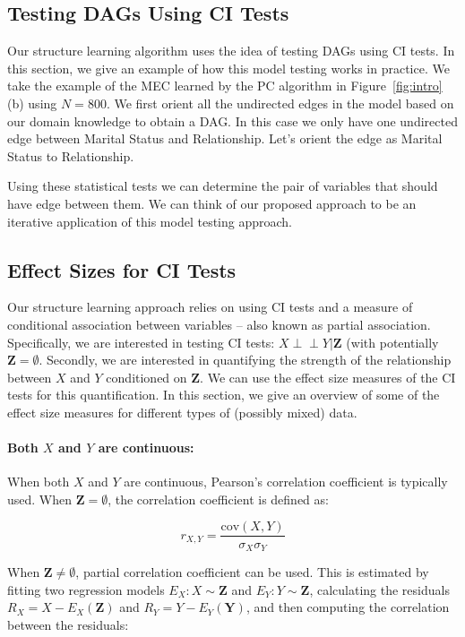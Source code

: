 \documentclass{uai2025} %
\def\ci{\perp\!\!\!\!\!\perp}
\begin{document}
\subsection{Testing DAGs Using CI Tests}
Our structure learning algorithm uses the idea of testing DAGs using CI tests.
In this section, we give an example of how this model testing works in
practice. We take the example of the MEC learned by the PC algorithm in
Figure~\ref{fig:intro}(b) using $ N=800 $. We first orient all the undirected
edges in the model based on our domain knowledge to obtain a DAG. In this case
we only have one undirected edge between Marital Status and Relationship. Let's
orient the edge as Marital Status to Relationship. 

Using these statistical tests we can determine the pair of variables that
should have edge between them. We can think of our proposed approach to be an
iterative application of this model testing approach.

\subsection{Effect Sizes for CI Tests}

Our structure learning approach relies on using CI tests and a measure of
conditional association between variables -- also known as partial association.
Specifically, we are interested in testing CI tests: $ X \ci Y \rvert \bm{Z} $
(with potentially $ \bm{Z} = \emptyset $. Secondly, we are interested in
quantifying the strength of the relationship between $ X $ and $ Y $
conditioned on $ \bm{Z} $. We can use the effect size measures of the CI tests
for this quantification. In this section, we give an overview of some of the
effect size measures for different types of (possibly mixed) data.

\paragraph{Both $ X $ and $ Y $ are continuous: }
When both $ X $ and $ Y $ are continuous, Pearson's correlation coefficient is
typically used. When $ \bm{Z} = \emptyset $, the correlation
coefficient is defined as:

\begin{equation}
	r_{X, Y} = \frac{\mathrm{cov}(X, Y)}{\sigma_X \sigma_Y}
\end{equation}

When $ \bm{Z} \neq \emptyset $, partial correlation coefficient can be used.
This is estimated by fitting two regression models $ E_X: X \sim \bm{Z} $ and $
E_Y: Y \sim \bm{Z} $, calculating the residuals $ R_X = X - E_X(\bm{Z}) $ and $
R_Y = Y - E_Y(\bm{Y}) $, and then computing the correlation between the
residuals:
\end{document}
